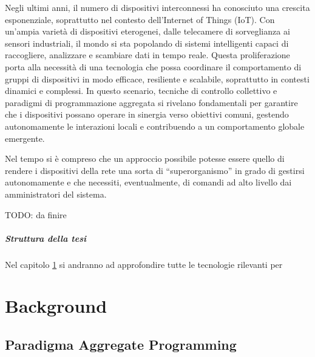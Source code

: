 \documentclass[12pt,a4paper,openright,twoside]{book}
\begin{document}
Negli ultimi anni, il numero di dispositivi interconnessi ha conosciuto una crescita esponenziale, soprattutto nel contesto dell'Internet of Things (IoT). Con un’ampia varietà di dispositivi eterogenei, dalle telecamere di sorveglianza ai sensori industriali, il mondo si sta popolando di sistemi intelligenti capaci di raccogliere, analizzare e scambiare dati in tempo reale. Questa proliferazione porta alla necessità di una tecnologia che possa coordinare il comportamento di gruppi di dispositivi in modo efficace, resiliente e scalabile, soprattutto in contesti dinamici e complessi. In questo scenario, tecniche di controllo collettivo e paradigmi di programmazione aggregata si rivelano fondamentali per garantire che i dispositivi possano operare in sinergia verso obiettivi comuni, gestendo autonomamente le interazioni locali e contribuendo a un comportamento globale emergente.

Nel tempo si è compreso che un approccio possibile potesse essere quello di rendere i dispositivi della rete una sorta di ``superorganismo'' in grado di gestirsi autonomamente e che necessiti, eventualmente, di comandi ad alto livello dai amministratori del sistema.

TODO: da finire

\paragraph{Struttura della tesi} Nel capitolo \cref{chap:background} si andranno ad approfondire tutte le tecnologie rilevanti per 

\chapter{Background}
\label{chap:background}




\section{Paradigma Aggregate Programming}
\end{document}
